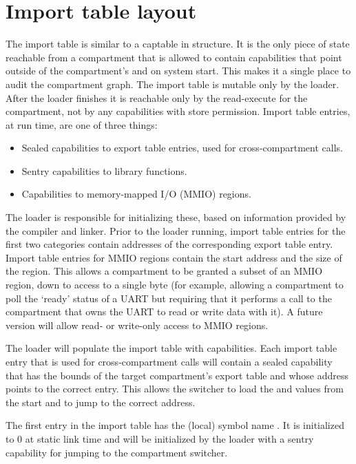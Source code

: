 \section{Import table layout}

The import table is similar to a captable in structure.
It is the only piece of state reachable from a compartment that is allowed to contain capabilities that point outside of the compartment's \PCC{} and \CGP{} on system start.
This makes it a single place to audit the compartment graph.
The import table is mutable only by the loader.
After the loader finishes it is reachable only by the read-execute \PCC{} for the compartment, not by any capabilities with store permission.
Import table entries, at run time, are one of three things:

\begin{itemize}
	\item Sealed capabilities to export table entries, used for cross-compartment calls.
	\item Sentry capabilities to library functions.
	\item Capabilities to memory-mapped I/O (MMIO) regions.
\end{itemize}

The loader is responsible for initializing these, based on information provided by the compiler and linker.
Prior to the loader running, import table entries for the first two categories contain addresses of the corresponding export table entry.
Import table entries for MMIO regions contain the start address and the size of the region.
This allows a compartment to be granted a subset of an MMIO region, down to access to a single byte (for example, allowing a compartment to poll the `ready' status of a UART but requiring that it performs a call to the compartment that owns the UART to read or write data with it).
A future version will allow read- or write-only access to MMIO regions.

The loader will populate the import table with capabilities.
Each import table entry that is used for cross-compartment calls will contain a sealed capability that has the bounds of the target compartment's export table and whose address points to the correct entry.
This allows the switcher to load the \PCC{} and \CGP{} values from the start and to jump to the correct address.

The first entry in the import table has the (local) symbol name .
It is initialized to 0 at static link time and will be initialized by the loader with a sentry capability for jumping to the compartment switcher.

